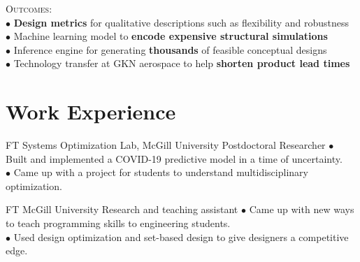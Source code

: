 \documentclass[10pt]{article} %
\begin{document}
\textsc{Outcomes:}\vspace{-0.5em} ~~~~~\\[1pt]

$\bullet$ \textbf{Design metrics} for qualitative descriptions such as flexibility and robustness\\[1pt]
$\bullet$ Machine learning model to \textbf{encode expensive structural simulations}\\[1pt]
$\bullet$ Inference engine for generating \textbf{thousands} of feasible conceptual designs\\[1pt]
$\bullet$ Technology transfer at GKN aerospace to help \textbf{shorten product lead times}


\section{Work Experience}





{FT} %
{Systems Optimization Lab, McGill University} %
{Postdoctoral Researcher} %
{
	$\bullet$ Built and implemented a COVID-19 predictive model in a time of uncertainty.\\
	$\bullet$ Came up with a project for students to understand multidisciplinary optimization.
} %


{FT} %
{McGill University} %
{Research and teaching assistant} %
{
	$\bullet$ Came up with new ways to teach programming skills to engineering students.\\
	$\bullet$ Used design optimization and set-based design to give designers a competitive edge.
}  %
\end{document}

